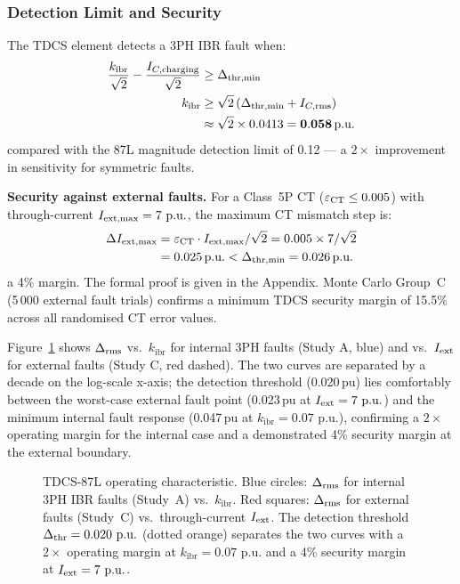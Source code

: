 \documentclass[journal,twoside,10pt]{IEEEtran}
\newcommand{\kibr}{k_{\mathrm{ibr}}}
\newcommand{\pu}{\,\text{p.u.}}
\begin{document}
\subsubsection{Detection Limit and Security}

The TDCS element detects a 3PH IBR fault when:
\begin{align}
  \frac{\kibr}{\sqrt{2}} - \frac{I_{C,\rm charging}}{\sqrt{2}}
    &\geq \Delta_{\rm thr,min} \notag \\
  \kibr &\geq \sqrt{2}\,(\Delta_{\rm thr,min} + I_{C,\rm rms}) \notag \\
        &\approx \sqrt{2} \times 0.0413 = \mathbf{0.058\pu}
  \label{eq:detlim}
\end{align}
compared with the 87L magnitude detection limit of 0.12\,\pu --- a
$2\times$ improvement in sensitivity for symmetric faults.

\textbf{Security against external faults.}  For a Class~5P CT
($\varepsilon_{\rm CT} \leq 0.005$) with through-current
$I_{\rm ext,max} = 7\,\pu$, the maximum CT mismatch step is:
\begin{equation}
  \begin{split}
  \Delta I_{\rm ext,max} &= \varepsilon_{\rm CT} \cdot I_{\rm ext,max}/\sqrt{2}
                          = 0.005 \times 7/\sqrt{2} \\
                         &= 0.025\pu < \Delta_{\rm thr,min} = 0.026\pu
  \end{split}
  \label{eq:tdcs_security}
\end{equation}
a 4\% margin.  The formal proof is given in the Appendix.
Monte Carlo Group~C (5\,000 external fault trials) confirms a minimum
TDCS security margin of 15.5\% across all randomised CT error values.

Figure~\ref{fig:tdcs} shows $\Delta_{\rm rms}$ vs.\ $\kibr$ for internal
3PH faults (Study A, blue) and vs.\ $I_{\rm ext}$ for external faults
(Study C, red dashed).  The two curves are separated by a decade on the
log-scale x-axis; the detection threshold (0.020\,pu) lies comfortably
between the worst-case external fault point (0.023\,pu at $I_{\rm ext}=7\,\pu$)
and the minimum internal fault response (0.047\,pu at $\kibr=0.07\,\pu$),
confirming a $2\times$ operating margin for the internal case and a
demonstrated 4\% security margin at the external boundary.

\begin{figure}[!t]
  \centering
  
  \caption{TDCS-87L operating characteristic.  Blue circles: $\Delta_{\rm rms}$
           for internal 3PH IBR faults (Study~A) vs.\ $\kibr$.
           Red squares: $\Delta_{\rm rms}$ for external faults (Study~C) vs.\
           through-current $I_{\rm ext}$.
           The detection threshold $\Delta_{\rm thr}=0.020\,\pu$ (dotted orange)
           separates the two curves with a $2\times$ operating margin at
           $\kibr=0.07\,\pu$ and a 4\% security margin at $I_{\rm ext}=7\,\pu$.}
  \label{fig:tdcs}
\end{figure}
\end{document}
